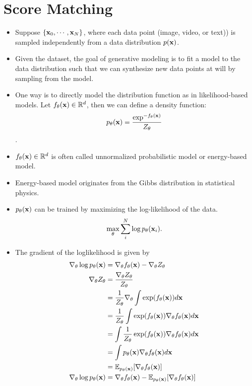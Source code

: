 \section{Score Matching}
\begin{itemize}
	\item Suppose $\{{\mathbf{x}}_0,\cdots,{\mathbf{x}}_N\}$, where each data point (\eg image, video, or text)) is sampled independently from a data distribution $p({\mathbf{x}})$. 
	\item Given the dataset, the goal of generative modeling is to fit a model to the data distribution such that we can synthesize new data points at will by sampling from the model. 
	\item One way is to directly model the distribution function as in likelihood-based models. Let $f_\theta({\mathbf{x}})\in \mathbb{R}^d$, then we can define a density function:
	$$p_\theta({\mathbf{x}}) = \frac{\exp^{-f_{\theta}({\mathbf{x}})}}{Z_\theta}$$.
	\item $f_\theta({\mathbf{x}})\in \mathbb{R}^d$ is often called unnormalized probabilistic model or energy-based model.
	\item Energy-based model originates from the Gibbs distribution in statistical physics.
	\item $p_\theta({\mathbf{x}})$ can be trained by maximizing the log-likelihood of the data.
		\begin{align*}
			\max_\theta \sum_i^N \log p_\theta({\mathbf{x}}_i).
		\end{align*}
	\item The gradient of the loglikelihood is given by
		\begin{align*}
			\nabla_\theta \log p_\theta(\rvx) &= \nabla_\theta f_\theta(\rvx)- \nabla_\theta Z_\theta\\
			\nabla_\theta Z_\theta	&= \frac{\nabla_\theta Z_\theta}{ Z_\theta}\\
									&= \frac{1}{ Z_\theta}\nabla_\theta \int\exp(f_\theta(\rvx))d\rvx \\
									&= \frac{1}{ Z_\theta} \int\exp(f_\theta(\rvx))\nabla_\theta f_\theta(\rvx)d\rvx \\
									&=  \int \frac{1}{ Z_\theta}\exp(f_\theta(\rvx))\nabla_\theta f_\theta(\rvx)d\rvx \\
									&=  \int p_\theta(\rvx)\nabla_\theta f_\theta(\rvx)d\rvx \\
									&=  \mathbb{E}_{p_\theta(\rvx)}[\nabla_\theta f_\theta(\rvx)] \\
			\nabla_\theta \log p_\theta(\rvx) &= \nabla_\theta f_\theta(\rvx) - \mathbb{E}_{p_\theta(\rvx)}[\nabla_\theta f_\theta(\rvx)]

\end{align*}
\end{itemize}
